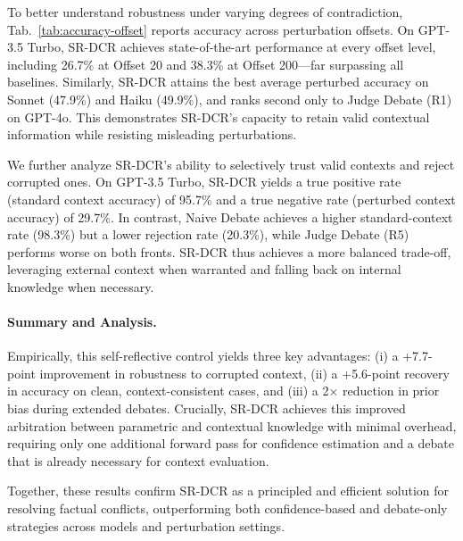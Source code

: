 \documentclass[11pt]{article}
\begin{document}
To better understand robustness under varying degrees of contradiction, Tab.~\ref{tab:accuracy-offset} reports accuracy across perturbation offsets. On GPT-3.5 Turbo, SR-DCR achieves state-of-the-art performance at every offset level, including 26.7\% at Offset 20 and 38.3\% at Offset 200—far surpassing all baselines. Similarly, SR-DCR attains the best average perturbed accuracy on Sonnet (47.9\%) and Haiku (49.9\%), and ranks second only to Judge Debate (R1) on GPT-4o. This demonstrates SR-DCR’s capacity to retain valid contextual information while resisting misleading perturbations.

We further analyze SR-DCR's ability to selectively trust valid contexts and reject corrupted ones. On GPT-3.5 Turbo, SR-DCR yields a true positive rate (standard context accuracy) of 95.7\% and a true negative rate (perturbed context accuracy) of 29.7\%. In contrast, Naive Debate achieves a higher standard-context rate (98.3\%) but a lower rejection rate (20.3\%), while Judge Debate (R5) performs worse on both fronts. SR-DCR thus achieves a more balanced trade-off, leveraging external context when warranted and falling back on internal knowledge when necessary.

\paragraph{Summary and Analysis.}  

Empirically, this self-reflective control yields three key advantages: (i) a +7.7-point improvement in robustness to corrupted context, (ii) a +5.6-point recovery in accuracy on clean, context-consistent cases, and (iii) a 2× reduction in prior bias during extended debates. Crucially, SR-DCR achieves this improved arbitration between parametric and contextual knowledge with minimal overhead, requiring only one additional forward pass for confidence estimation and a debate that is already necessary for context evaluation.

Together, these results confirm SR-DCR as a principled and efficient solution for resolving factual conflicts, outperforming both confidence-based and debate-only strategies across models and perturbation settings.
\end{document}
